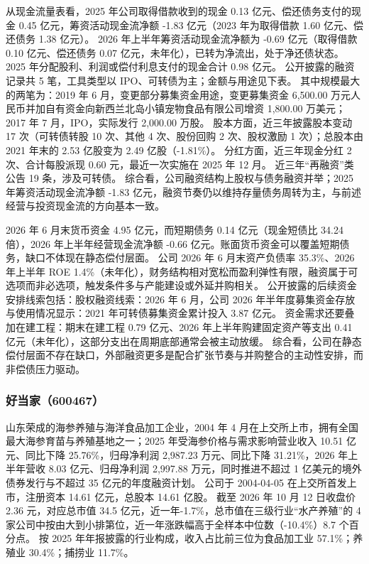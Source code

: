  从现金流量表看，2025 年公司取得借款收到的现金 0.13 亿元、偿还债务支付的现金 0.45 亿元，筹资活动现金流净额 -1.83 亿元（2023 年为取得借款 1.60 亿元、偿还债务 1.38 亿元）。 2026 年上半年筹资活动现金流净额为 -0.69 亿元（取得借款 0.10 亿元、偿还债务 0.07 亿元，未年化），已转为净流出，处于净还债状态。 2025 年分配股利、利润或偿付利息支付的现金合计 0.98 亿元。 公开披露的融资记录共 5 笔，工具类型以 IPO、可转债为主；金额与用途见下表。 其中规模最大的两笔为：2019 年 6 月，变更部分募集资金用途，变更募集资金 6,500.00 万元人民币并加自有资金向新西兰北岛小镇宠物食品有限公司增资 1,800.00 万美元；2017 年 7 月，IPO，实际发行 2,000.00 万股。 股本方面，近三年披露股本变动 17 次（可转债转股 10 次、其他 4 次、股份回购 2 次、股权激励 1 次）；总股本由 2021 年末的 2.53 亿股变为 2.49 亿股（-1.81\%）。 分红方面，近三年现金分红 2 次、合计每股派现 0.60 元，最近一次实施在 2025 年 12 月。 近三年“再融资”类公告 19 条，涉及可转债。 综合看，公司融资结构上股权与债务融资并举；2025 年筹资活动现金流净额 -1.83 亿元，融资节奏仍以维持存量债务周转为主，与前述经营与投资现金流的方向基本一致。

 2026 年 6 月末货币资金 4.95 亿元，而短期债务 0.14 亿元（现金短债比 34.24 倍），2026 年上半年经营现金流净额 -0.66 亿元。账面货币资金可以覆盖短期债务，缺口不体现在静态偿付层面。 公司 2026 年 6 月末资产负债率 35.3\%、2026 年上半年 ROE 1.4\%（未年化），财务结构相对宽松而盈利弹性有限，融资属于可选项而非必选项，触发条件多与产能建设或外延并购相关。 公开披露的后续资金安排线索包括：股权融资线索：2026 年 6 月，公司 2026 年半年度募集资金存放与使用情况显示：2021 年可转债募集资金累计投入 3.87 亿元。 资金需求还要叠加在建工程：期末在建工程 0.79 亿元、2026 年上半年购建固定资产等支出 0.41 亿元（未年化），这部分支出在周期底部通常会被主动放缓。 综合看，公司在静态偿付层面不存在缺口，外部融资更多是配合扩张节奏与并购整合的主动性安排，而非偿债压力驱动。




\subsubsection{好当家（600467）}
\label{co:600467}

 山东荣成的海参养殖与海洋食品加工企业，2004 年 4 月在上交所上市，拥有全国最大海参育苗与养殖基地之一；2025 年受海参价格与需求影响营业收入 10.51 亿元、同比下降 25.76\%，归母净利润 2,987.23 万元、同比下降 31.21\%，2026 年上半年营收 8.03 亿元、归母净利润 2,997.88 万元，同时推进不超过 1 亿美元的境外债券发行与不超过 35 亿元的年度融资计划。 公司于 2004-04-05 在上交所首发上市，注册资本 14.61 亿元，总股本 14.61 亿股。 截至 2026 年 10 月 12 日收盘价 2.36 元，对应总市值 34.5 亿元，近一年-1.7\%，总市值在三级行业“水产养殖”的 4 家公司中按由大到小排第位，近一年涨跌幅高于全样本中位数（-10.4\%）8.7 个百分点。 按 2025 年年报披露的行业构成，收入占比前三位为食品加工业 57.1\%；养殖业 30.4\%；捕捞业 11.7\%。

